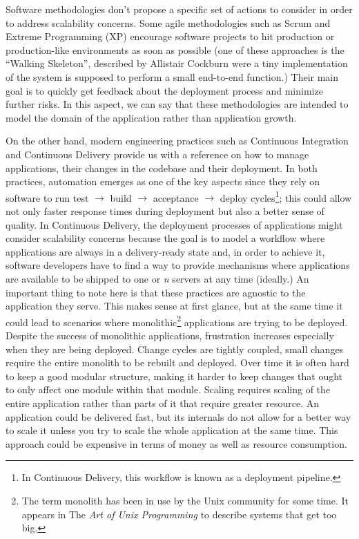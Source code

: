\documentclass[10pt,article]{IEEEtran}
\begin{document}
Software methodologies don't propose a specific set of actions to consider in order to address scalability concerns. Some agile methodologies such as Scrum and Extreme Programming (XP) encourage software projects to hit production or production-like environments as soon as possible (one of these approaches is the ``Walking Skeleton'', described by Allistair Cockburn\cite{cockburn} were a tiny implementation of the system is supposed to perform a small end-to-end function.) Their main goal is to quickly get feedback about the deployment process and minimize further risks. In this aspect, we can say that these methodologies are intended to model the domain of the application rather than application growth.

On the other hand, modern engineering practices such as Continuous Integration and Continuous Delivery provide us with a reference on how to manage applications, their changes in the codebase and their deployment. In both practices, automation emerges as one of the key aspects since they rely on software to run test $\to$ build $\to$ acceptance $\to$ deploy cycles\footnote{In Continuous Delivery, this workflow is known as a deployment pipeline.}; this could allow not only faster response times during deployment but also a better sense of quality\cite{humble}. In Continuous Delivery, the deployment processes of applications might consider scalability concerns because the goal is to model a workflow where applications are always in a delivery-ready state and, in order to achieve it, software developers have to find a way to provide mechanisms where applications are available to be shipped to one or \textit{n} servers at any time (ideally.)
An important thing to note here is that these practices are agnostic to the application they serve. This makes sense at first glance, but at the same time it could lead to scenarios where monolithic\footnote{The term monolith has been in use by the Unix community for some time. It appears in The \emph{Art of Unix Programming} to describe systems that get too big.} applications are trying to be deployed. Despite the success of monolithic applications, frustration increases especially when they are being deployed. Change cycles are tightly coupled, small changes require the entire monolith to be rebuilt and deployed. Over time it is often hard to keep a good modular structure, making it harder to keep changes that ought to only affect one module within that module. Scaling requires scaling of the entire application rather than parts of it that require greater resource\cite{monolit:fowler}. An application could be delivered fast, but its internals do not allow for a better way to scale it unless you try to scale the whole application at the same time. This approach could be expensive in terms of money as well as resource consumption. 
\end{document}
